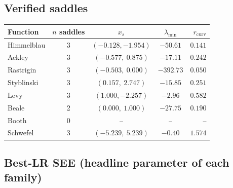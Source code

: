 \documentclass[11pt]{article}
\begin{document}
\subsection{Verified saddles}

\begin{center}
\begin{tabular}{lcccr}
\toprule
Function & $n$ saddles & $x_s$ & $\lambda_{\min}$ & $r_{\mathrm{curv}}$ \\
\midrule
Himmelblau & 3 & $(-0.128,-1.954)$ & $-50.61$ & $0.141$ \\
Ackley     & 3 & $(-0.577,\ 0.875)$ & $-17.11$ & $0.242$ \\
Rastrigin  & 3 & $(-0.503,\ 0.000)$ & $-392.73$ & $0.050$ \\
Styblinski & 3 & $(0.157,\ 2.747)$ & $-15.85$ & $0.251$ \\
Levy       & 3 & $(1.000,-2.257)$ & $-2.96$ & $0.582$ \\
Beale      & 2 & $(0.000,\ 1.000)$ & $-27.75$ & $0.190$ \\
Booth      & 0 & -- & -- & -- \\
Schwefel   & 3 & $(-5.239,\ 5.239)$ & $-0.40$ & $1.574$ \\
\bottomrule
\end{tabular}
\end{center}

\subsection{Best-LR SEE (headline parameter of each family)}
\end{document}
